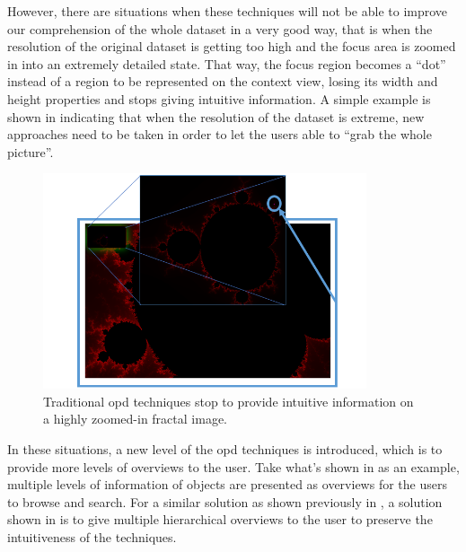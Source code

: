 However, there are situations when these techniques will not be able to improve our comprehension of the whole dataset in a very good way, that is when the resolution of the original dataset is getting too high and the focus area is zoomed in into an extremely detailed state. That way, the focus region becomes a ``dot'' instead of a region to be represented on the context view, losing its width and height properties and stops giving intuitive information. A simple example is shown in  indicating that when the resolution of the dataset is extreme, new approaches need to be taken in order to let the users able to ``grab the whole picture''.

\begin{figure}[H]
\centering
\includegraphics[width=0.85\textwidth,keepaspectratio]{Figures/Chapter1/becomespoint.png}
\decoRule
\caption[Focus Region Becomes A Dot On Context Region]{Traditional \gls{opd} techniques stop to provide intuitive information on a highly zoomed-in fractal image.}
\label{fig:becomespoint}
\end{figure}

In these situations, a new level of the \gls{opd} techniques is introduced, which is to provide more levels of overviews to the user. Take what's shown in  as an example, multiple levels of information of objects are presented as overviews for the users to browse and search. For a similar solution as shown previously in , a solution shown in  is to give multiple hierarchical overviews to the user to preserve the intuitiveness of the techniques.

